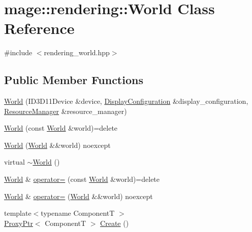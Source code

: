 \hypertarget{classmage_1_1rendering_1_1_world}{}\section{mage\+:\+:rendering\+:\+:World Class Reference}
\label{classmage_1_1rendering_1_1_world}


{\ttfamily \#include $<$rendering\+\_\+world.\+hpp$>$}

\subsection*{Public Member Functions}
\begin{DoxyCompactItemize}
\item 
\mbox{\hyperlink{classmage_1_1rendering_1_1_world_af9fc38564ff93abc8c760ab15f1faffe}{World}} (I\+D3\+D11\+Device \&device, \mbox{\hyperlink{classmage_1_1rendering_1_1_display_configuration}{Display\+Configuration}} \&display\+\_\+configuration, \mbox{\hyperlink{classmage_1_1rendering_1_1_resource_manager}{Resource\+Manager}} \&resource\+\_\+manager)
\item 
\mbox{\hyperlink{classmage_1_1rendering_1_1_world_a984d1e05e0bd1dc476db76339eefc2ec}{World}} (const \mbox{\hyperlink{classmage_1_1rendering_1_1_world}{World}} \&world)=delete
\item 
\mbox{\hyperlink{classmage_1_1rendering_1_1_world_ab21bdb575e6b0c2106390ed35763a831}{World}} (\mbox{\hyperlink{classmage_1_1rendering_1_1_world}{World}} \&\&world) noexcept
\item 
virtual \mbox{\hyperlink{classmage_1_1rendering_1_1_world_a97d321ddb178e24758bb40d74968ac51}{$\sim$\+World}} ()
\item 
\mbox{\hyperlink{classmage_1_1rendering_1_1_world}{World}} \& \mbox{\hyperlink{classmage_1_1rendering_1_1_world_aff83cf89dc28c141ca7b7a0cbc28e2ae}{operator=}} (const \mbox{\hyperlink{classmage_1_1rendering_1_1_world}{World}} \&world)=delete
\item 
\mbox{\hyperlink{classmage_1_1rendering_1_1_world}{World}} \& \mbox{\hyperlink{classmage_1_1rendering_1_1_world_a7f44f10905070997553a7c7ad90ddcb2}{operator=}} (\mbox{\hyperlink{classmage_1_1rendering_1_1_world}{World}} \&\&world) noexcept
\item 
{\footnotesize template$<$typename ComponentT $>$ }\\\mbox{\hyperlink{classmage_1_1_proxy_ptr}{Proxy\+Ptr}}$<$ ComponentT $>$ \mbox{\hyperlink{classmage_1_1rendering_1_1_world_a2b653a260b5a74f579efb1416f0e2c7d}{Create}} ()

\end{DoxyCompactItemize}
